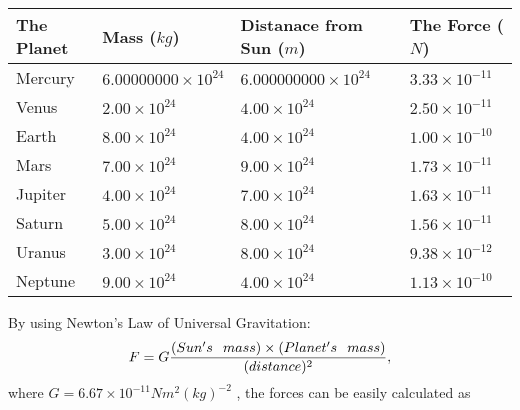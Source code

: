 \documentclass[12pt]{article}
\begin{document}
 
\begin{tabular}{|l|l|l|l|}
\hline
The Planet & Mass ($kg$) & Distanace from Sun ($m$) & The Force ($N$)\\
\hline
Mercury  &
           $ %
6.00000000 \times 10^{24} $   &
             $ %
6.000000000 \times 10^{24} $    & $ %
3.33 \times 10^{-11} $
\\  \hline
Venus    &
           $  %
2.00 \times 10^{24}  $     &
             $ %
4.00 \times 10^{24} $    & $ %
2.50 \times 10^{-11} $
\\  \hline
Earth    &
           $  %
8.00 \times 10^{24}  $     &
             $ %
4.00 \times 10^{24} $    & $ %
1.00 \times 10^{-10} $
\\   \hline
Mars     &
           $  %
7.00 \times 10^{24} $     &
             $ %
9.00 \times 10^{24} $    & $ %
1.73 \times 10^{-11} $
\\   \hline
Jupiter  &
           $  %
4.00 \times 10^{24} $    &
             $ %
7.00 \times 10^{24} $    & $ %
1.63 \times 10^{-11} $
\\  \hline
Saturn   &
           $  %
5.00 \times 10^{24} $    &
             $ %
8.00 \times 10^{24}  $    & $ %
1.56 \times 10^{-11} $
\\  \hline
Uranus   &
           $  %
3.00 \times 10^{24} $    &
             $ %
8.00 \times 10^{24} $    & $ %
9.38 \times 10^{-12} $
\\  \hline
Neptune  &
           $  %
9.00 \times 10^{24} $    &
             $ %
4.00 \times 10^{24} $    & $ %
1.13 \times 10^{-10} $
\\  \hline
 
\end{tabular}
 
 
 
 
\noindent{}
 
 

 
 
 
 
\noindent{}
 
 

By using Newton's Law of Universal Gravitation:
\[
F=G \frac{(Sun's \hspace{0.1in} mass) \times (Planet's \hspace{0.1in} mass)} { (distance)^2},
\]
where
$ G= %
6.67 \times 10^{-11} N m^{2}(kg)^{-2}$ , the forces can be easily calculated as
 
\end{document}
